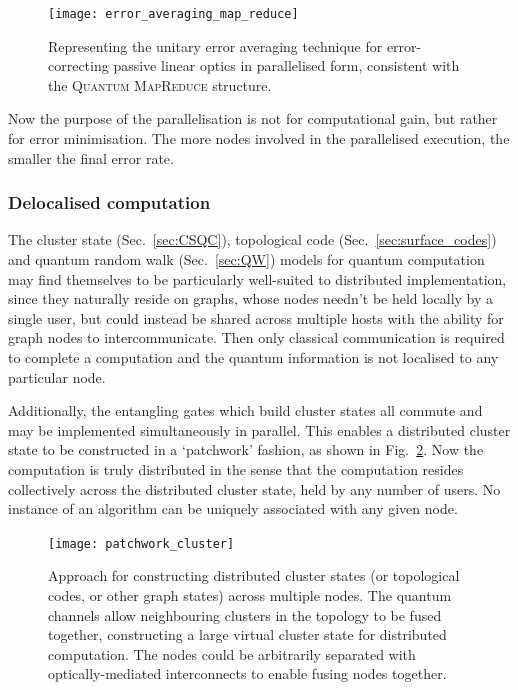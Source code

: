 \begin{figure}[!htbp]
	\texttt{[image: error\_averaging\_map\_reduce]}
	\captionspacefig \caption{Representing the unitary error averaging technique for error-correcting passive linear optics in parallelised form, consistent with the \textsc{Quantum MapReduce} structure.}\label{fig:error_av_map_reduce}
\end{figure}

Now the purpose of the parallelisation is not for computational gain, but rather for error minimisation. The more nodes involved in the parallelised execution, the smaller the final error rate.

\subsubsection{Delocalised computation}

The cluster state (Sec.~\ref{sec:CSQC}), topological code (Sec.~\ref{sec:surface_codes}) and quantum random walk (Sec.~\ref{sec:QW}) models for quantum computation may find themselves to be particularly well-suited to distributed implementation, since they naturally reside on graphs, whose nodes needn't be held locally by a single user, but could instead be shared across multiple hosts with the ability for graph nodes to intercommunicate. Then only classical communication is required to complete a computation and the quantum information is not localised to any particular node.

Additionally, the entangling gates which build cluster states all commute and may be implemented simultaneously in parallel. This enables a distributed cluster state to be constructed in a `patchwork' fashion, as shown in Fig.~\ref{fig:patchwork_cluster}. Now the computation is truly distributed in the sense that the computation resides collectively across the distributed cluster state, held by any number of users. No instance of an algorithm can be uniquely associated with any given node.

\begin{figure}[!htbp]
\texttt{[image: patchwork\_cluster]} 
\captionspacefig \caption{Approach for constructing distributed cluster states (or topological codes, or other graph states) across multiple nodes. The quantum channels allow neighbouring clusters in the topology to be fused together, constructing a large virtual cluster state for distributed computation. The nodes could be arbitrarily separated with optically-mediated interconnects to enable fusing nodes together.} \label{fig:patchwork_cluster}
\end{figure}

